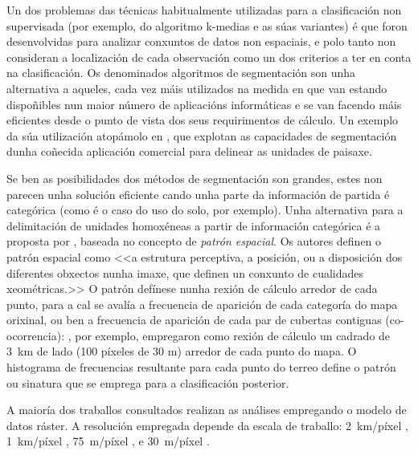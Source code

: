 \documentclass[11pt,a4paper]{article}
\begin{document}
Un dos problemas das técnicas habitualmente utilizadas para a clasificación non supervisada (por exemplo, do algoritmo k-medias e as súas variantes) é que foron desenvolvidas para analizar conxuntos de datos non espaciais, e polo tanto non consideran a localización de cada observación como un dos criterios a ter en conta na clasificación. Os denominados algoritmos de segmentación son unha alternativa a aqueles, cada vez máis utilizados na medida en que van estando dispoñibles nun maior número de aplicacións informáticas e se van facendo máis eficientes desde o punto de vista dos seus requirimentos de cálculo. Un exemplo da súa utilización atopámolo en \citet{Mucher201087}, que explotan as capacidades de segmentación dunha coñecida aplicación comercial para delinear as unidades de paisaxe.

Se ben as posibilidades dos métodos de segmentación son grandes, estes non parecen unha solución eficiente cando unha parte da información de partida é categórica (como é o caso do uso do solo, por exemplo). Unha alternativa para a delimitación de unidades homoxéneas a partir de información categórica é a proposta por \citet{Jasiewicz201562}, baseada no concepto de \emph{patrón espacial}. Os autores definen o patrón espacial como <<a estrutura perceptiva, a posición, ou a disposición dos diferentes obxectos nunha imaxe, que definen un conxunto de cualidades xeométricas.>> O patrón defínese nunha rexión de cálculo arredor de cada punto, para a cal se avalía a frecuencia de aparición de cada categoría do mapa orixinal, ou ben a frecuencia de aparición de cada par de cubertas contiguas (co-ocorrencia): \citet{Niesterowicz2013250}, por exemplo, empregaron como rexión de cálculo un cadrado de 3~km de lado (100 píxeles de 30 m) arredor de cada punto do mapa. O histograma de frecuencias resultante para cada punto do terreo define o patrón ou sinatura que se emprega para a clasificación posterior.

A maioría dos traballos consultados realizan as análises empregando o modelo de datos ráster. A resolución empregada depende da escala de traballo: 2~km/píxel \citep[sobre toda a República Checa]{Chuman2010200}, 1~km/píxel \citep[Unión Europea]{Mucher201087}, 75~m/píxel \citep[Italia]{Capotorti2012174}, e 30~m/píxel \citep[Polonia]{Jasiewicz2014104}.
\end{document}
